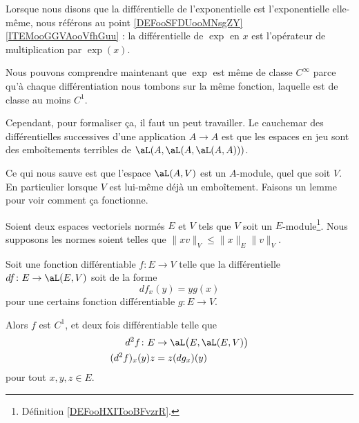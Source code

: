 \begin{normaltext}
    Lorsque nous disons que la différentielle de l'exponentielle est l'exponentielle elle-même, nous référons au point \ref{DEFooSFDUooMNsgZY}\ref{ITEMooGGVAooVfhGuu} : la différentielle de \( \exp\) en \( x\) est l'opérateur de multiplication par \( \exp(x)\).

    Nous pouvons comprendre maintenant que \( \exp\) est même de classe \(  C^{\infty}\) parce qu'à chaque différentiation nous tombons sur la même fonction, laquelle est de classe au moins \( C^1\).

    Cependant, pour formaliser ça, il faut un peut travailler. Le cauchemar des différentielles successives d'une application \( A\to A\) est que les espaces en jeu sont des emboîtements terribles de \( \aL(A,\aL(A,\aL(A,A)))\).

    Ce qui nous sauve est que l'espace \( \aL(A,V)\) est un \( A\)-module, quel que soit \( V\). En particulier lorsque \( V\) est lui-même déjà un emboîtement. Faisons un lemme pour voir comment ça fonctionne.
\end{normaltext}

\begin{lemma}
    Soient deux espaces vectoriels normés \( E\) et \( V\) tels que \( V\) soit un \( E\)-module\footnote{Définition \ref{DEFooHXITooBFvzrR}.}. Nous supposons les normes soient telles que \( \| xv \|_{V}\leq \| x \|_E\| v \|_V\).

    Soit une fonction différentiable \( f\colon E\to V\) telle que la différentielle \( df\colon E\to \aL(E,V)\) soit de la forme
    \begin{equation}
        df_x(y)=yg(x)
    \end{equation}
    pour une certains fonction différentiable \( g\colon E\to V\).

    Alors \( f\) est \( C^1\), et deux fois différentiable telle que
    \begin{equation}
        \begin{aligned}
            d^2f\colon E&\to \aL\big( E,\aL(E,V) \big) \\
            (d^2f)_x(y)z&=z(dg_x)(y)
        \end{aligned}
    \end{equation}
    pour tout \( x,y,z\in E\).
\end{lemma}

